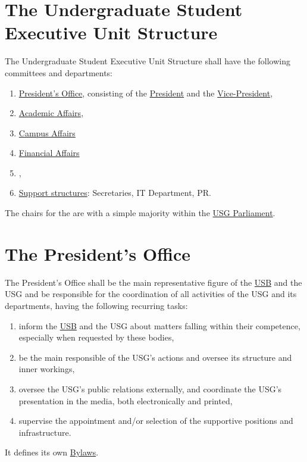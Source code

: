 \label{USGexecutiveUnitDef}

\section{The Undergraduate Student Executive Unit Structure} 
\label{USGstructure}
The Undergraduate Student Executive Unit Structure shall have the following committees and departments:
\begin{enumerate}
\item \hyperref[PresidentOfficeDef]{President's Office}, consisting of the \hyperref[PresDef]{President} and the \hyperref[VPDef]{Vice-President},
\item \hyperref[AACdef]{Academic Affairs}\add[S]{,},
\item \hyperref[CACdef]{Campus Affairs}\add[S]{,}
\item \hyperref[Financesdef]{Financial Affairs}\add[S]{,}
\item \hyperref[IACdef]{},
\item \hyperref[suppstrucdef]{Support structures}: Secretaries, IT Department, PR.
\end{enumerate}
The chairs for the  are  with a simple majority within the \hyperref[USGParliamentDef]{USG Parliament}.


\section{The President's Office} 
\label{PresidentOfficeDef}
The President's Office shall be the main representative figure of the \hyperref[studentbody]{USB} and the USG and be responsible for the coordination of all activities of the USG and its departments, having the following recurring tasks:
\begin{enumerate}
\item {} inform the \hyperref[studentbody]{USB} and the USG about matters falling within their competence, especially when requested by these bodies,
\item be the main responsible of the USG's actions and oversee its structure and inner workings,
\item oversee the USG's public relations externally, and coordinate the USG's presentation in the media, both electronically and printed,
\item supervise the appointment and/or selection of the supportive positions and infrastructure.
\end{enumerate}
It defines its own \hyperref[PresByLawsDef]{Bylaws}.

